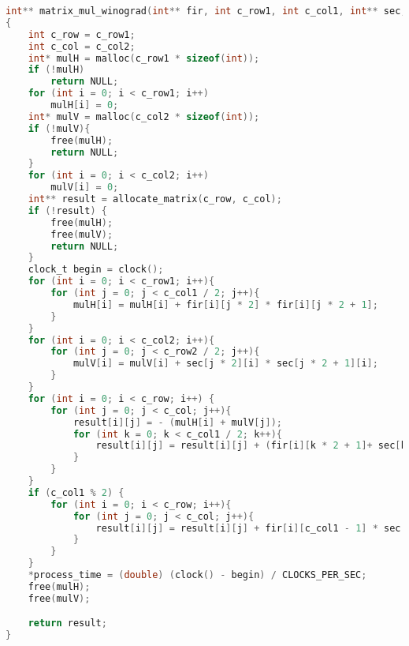 \documentclass{bmstu}
\begin{document}
\begin{center}
\captionsetup{justification=raggedright,singlelinecheck=off}
\begin{lstlisting}[label=lst:win, language=c, numbers=none, caption=Реализация алгоритма Винограда]
int** matrix_mul_winograd(int** fir, int c_row1, int c_col1, int** sec, int c_row2, int c_col2, double *process_time)
{
    int c_row = c_row1;
    int c_col = c_col2;
    int* mulH = malloc(c_row1 * sizeof(int));
    if (!mulH)
        return NULL;
    for (int i = 0; i < c_row1; i++)
        mulH[i] = 0;
    int* mulV = malloc(c_col2 * sizeof(int));
    if (!mulV){
        free(mulH);
        return NULL;
    }
    for (int i = 0; i < c_col2; i++)
        mulV[i] = 0;
    int** result = allocate_matrix(c_row, c_col);
    if (!result) {
        free(mulH);
        free(mulV);
        return NULL;
    }
    clock_t begin = clock();
    for (int i = 0; i < c_row1; i++){
        for (int j = 0; j < c_col1 / 2; j++){
            mulH[i] = mulH[i] + fir[i][j * 2] * fir[i][j * 2 + 1];
        }
    }
    for (int i = 0; i < c_col2; i++){
        for (int j = 0; j < c_row2 / 2; j++){
            mulV[i] = mulV[i] + sec[j * 2][i] * sec[j * 2 + 1][i];
        }
    }
    for (int i = 0; i < c_row; i++) {
        for (int j = 0; j < c_col; j++){
            result[i][j] = - (mulH[i] + mulV[j]);
            for (int k = 0; k < c_col1 / 2; k++){
                result[i][j] = result[i][j] + (fir[i][k * 2 + 1]+ sec[k * 2][j]) * (fir[i][k * 2] + sec[k * 2 + 1][j]);
            }
        }
    }
    if (c_col1 % 2) {
        for (int i = 0; i < c_row; i++){
            for (int j = 0; j < c_col; j++){
                result[i][j] = result[i][j] + fir[i][c_col1 - 1] * sec[c_col1 - 1][j];
            }
        }
    }
    *process_time = (double) (clock() - begin) / CLOCKS_PER_SEC;
    free(mulH);
    free(mulV);

    return result;
}
\end{lstlisting}
\end{center}
\end{document}
